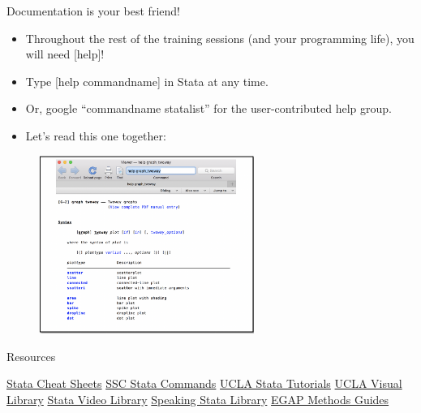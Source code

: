\documentclass[aspectratio=169]{beamer}
\begin{document}
\begin{frame}[fragile]{Documentation is your best friend!}
\begin{multicols}{2}	
	
	\begin{itemize}[<default overlay specification>]
		\item<1>  Throughout the rest of the training sessions (and your programming life), you will need [help]!
		\item<1>  Type [help commandname] in Stata at any time.
		\item<1>  Or, google “commandname statalist” for the user-contributed help group. 
		\item<1>  Let’s read this one together:
	\end{itemize}
	
	\begin{figure}
		\centering
		\includegraphics[width=70mm, right]{img/Help_file}
	\end{figure}
	
\end{multicols}
\end{frame}


\begin{frame}{Resources}

\leavevmode 	\newline \underline{Stata Cheat Sheets}
\leavevmode 	\newline \underline{SSC Stata Commands}
\leavevmode 	\newline \underline{UCLA Stata Tutorials}
\leavevmode 	\newline \underline{UCLA Visual Library}
\leavevmode 	\newline \underline{Stata Video Library}
\leavevmode 	\newline \underline{Speaking Stata Library}
\leavevmode 	\newline \underline{EGAP Methods Guides}

\end{frame}
\end{document}
